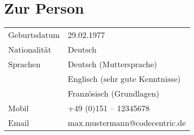 \section*{Zur Person}
\begin{longtable}{@{}p{6cm}p{10cm}}
Geburtsdatum 	& 29.02.1977\\
Nationalität 	& Deutsch\\
Sprachen 	& Deutsch (Muttersprache)\\
		& Englisch (sehr gute Kenntnisse)\\
		& Französisch (Grundlagen)\\
Mobil		& +49 (0)151 – 12345678\\
Email		& max.mustermann@codecentric.de
\end{longtable}

